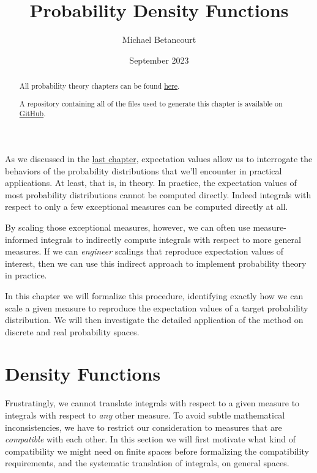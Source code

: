 \documentclass[
  letterpaper,
  DIV=11,
  numbers=noendperiod]{scrartcl}
\title{Probability Density Functions}
\author{Michael Betancourt}
\date{September 2023}
\renewcommand*\contentsname{Table of contents}
\newcommand\contentsname{Table of contents}
\begin{document}
\maketitle
\begin{abstract}
All probability theory chapters can be found
\href{http://www.symplectomorphic.com/writing/\#part1}{here}.

A repository containing all of the files used to generate this chapter
is available on
\href{https://github.com/betanalpha/quarto_chapters/tree/main/6_density_functions}{GitHub}.
\end{abstract}

\renewcommand*\contentsname{Table of contents}
{
\hypersetup{linkcolor=}
\setcounter{tocdepth}{3}
\tableofcontents
}
As we discussed in the
\href{http://www.symplectomorphic.com/assets/chapters_html/expectation_values.html}{last
chapter}, expectation values allow us to interrogate the behaviors of
the probability distributions that we'll encounter in practical
applications. At least, that is, in theory. In practice, the expectation
values of most probability distributions cannot be computed directly.
Indeed integrals with respect to only a few exceptional measures can be
computed directly at all.

By scaling those exceptional measures, however, we can often use
measure-informed integrals to indirectly compute integrals with respect
to more general measures. If we can \emph{engineer} scalings that
reproduce expectation values of interest, then we can use this indirect
approach to implement probability theory in practice.

In this chapter we will formalize this procedure, identifying exactly
how we can scale a given measure to reproduce the expectation values of
a target probability distribution. We will then investigate the detailed
application of the method on discrete and real probability spaces.

\section{Density Functions}\label{density-functions}

Frustratingly, we cannot translate integrals with respect to a given
measure to integrals with respect to \emph{any} other measure. To avoid
subtle mathematical inconsistencies, we have to restrict our
consideration to measures that are \emph{compatible} with each other. In
this section we will first motivate what kind of compatibility we might
need on finite spaces before formalizing the compatibility requirements,
and the systematic translation of integrals, on general spaces.
\end{document}
